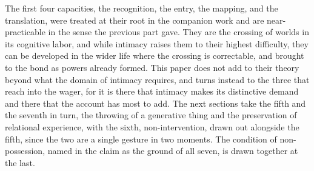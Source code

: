 The first four capacities, the recognition, the entry, the mapping, and the translation, were treated at their root in the companion work and are near-practicable in the sense the previous part gave. They are the crossing of worlds in its cognitive labor, and while intimacy raises them to their highest difficulty, they can be developed in the wider life where the crossing is correctable, and brought to the bond as powers already formed. This paper does not add to their theory beyond what the domain of intimacy requires, and turns instead to the three that reach into the wager, for it is there that intimacy makes its distinctive demand and there that the account has most to add. The next sections take the fifth and the seventh in turn, the throwing of a generative thing and the preservation of relational experience, with the sixth, non-intervention, drawn out alongside the fifth, since the two are a single gesture in two moments. The condition of non-possession, named in the claim as the ground of all seven, is drawn together at the last.
